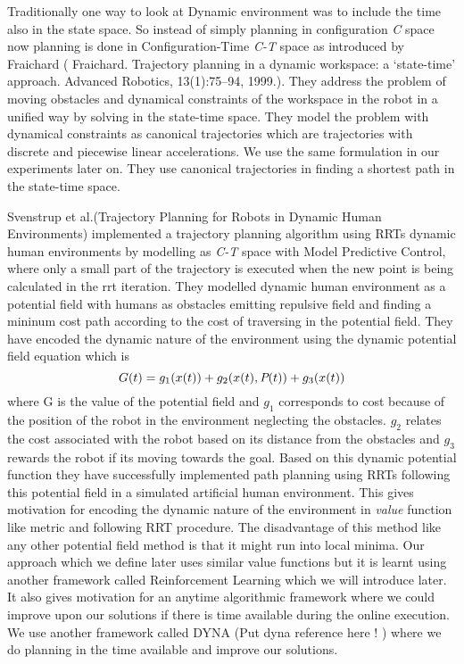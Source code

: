\documentclass[MTech]{iitmdiss}
\begin{document}
Traditionally one way to look at Dynamic environment was to include the time also in the state space. So instead of simply planning in configuration \emph{C} space now planning is done in Configuration-Time \emph{C-T} space as introduced by Fraichard (  Fraichard. Trajectory planning in a dynamic workspace: a ‘state-time’ approach. Advanced Robotics, 13(1):75–94, 1999.). They address the problem of moving obstacles and dynamical constraints of the workspace in the robot in a unified way by solving in the state-time space. They model the problem with dynamical constraints as canonical trajectories which are trajectories with discrete and piecewise linear accelerations. We use the same formulation in our experiments later on. They use canonical trajectories in finding a shortest path in the state-time space. 

Svenstrup et al.(Trajectory Planning for Robots in Dynamic Human Environments) implemented a trajectory planning algorithm using RRTs dynamic human environments by modelling as \emph{C-T} space with Model Predictive Control, where only a small part of the trajectory is executed when the new point is being calculated in the rrt iteration. They modelled dynamic human environment as a potential field with humans as obstacles emitting repulsive field and finding a mininum cost path according to the cost of traversing in the potential field. They have encoded the dynamic nature of the environment using the dynamic potential field equation which is 
$$G(t) = g_1(x(t)) + g_2(x(t), \emph{P}(t) )+ g_3(x(t)) $$
where G is the value of the potential field and $g_1$ corresponds to cost because of the position of the robot in the environment neglecting the obstacles. $g_2$ relates the cost associated with the robot based on its distance from the obstacles and $g_3$ rewards the robot if its moving towards the goal. Based on this dynamic potential function they have successfully implemented path planning using RRTs following this potential field in a simulated artificial human environment. This gives motivation for encoding the dynamic nature of the environment in \textit{value} function like metric and following RRT procedure. The disadvantage of this method like any other potential field method is that it might run into local minima. Our approach which we define later uses similar value functions but it is learnt using another framework called Reinforcement Learning which we will introduce later. It also gives motivation for an anytime algorithmic framework where we could improve upon our solutions if there is time available during the online execution. We use another framework called DYNA (Put dyna reference here ! ) where we do planning in the time available and improve our solutions. 
\end{document}
